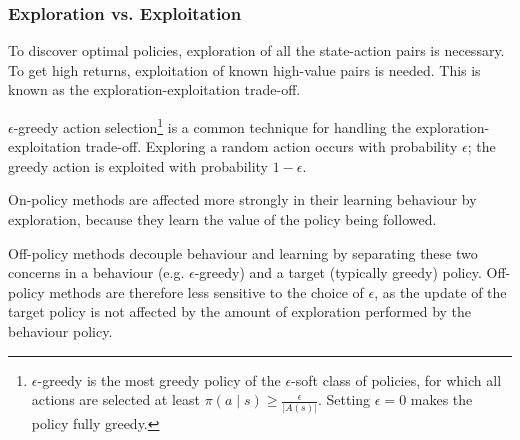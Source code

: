 \documentclass[12pt]{article}
\begin{document}
\subsubsection{Exploration vs. Exploitation}

To discover optimal policies, exploration of all the state-action pairs is necessary.
To get high returns, exploitation of known high-value pairs is needed.
This is known as the exploration-exploitation trade-off.

$\epsilon$-greedy action selection\footnote{
	$\epsilon$-greedy is the most greedy policy of the $\epsilon$-soft class of policies, for which
	all actions are selected at least $\pi(a \mid s) \geq \frac{\epsilon}{\lvert A(s) \rvert}$.
	Setting $\epsilon = 0$ makes the policy fully greedy.
} is a common technique for handling the exploration-exploitation trade-off.
Exploring a random action occurs with probability $\epsilon$;
the greedy action is exploited with probability $1 - \epsilon$.

On-policy methods are affected more strongly in their learning behaviour by exploration,
because they learn the value of the policy being followed.

Off-policy methods decouple behaviour and learning by separating these two concerns in
a behaviour (e.g. $\epsilon$-greedy) and a target (typically greedy) policy.
Off-policy methods are therefore less sensitive to the choice of \(\epsilon\),
as the update of the target policy is not affected
by the amount of exploration performed by the behaviour policy.
\end{document}

